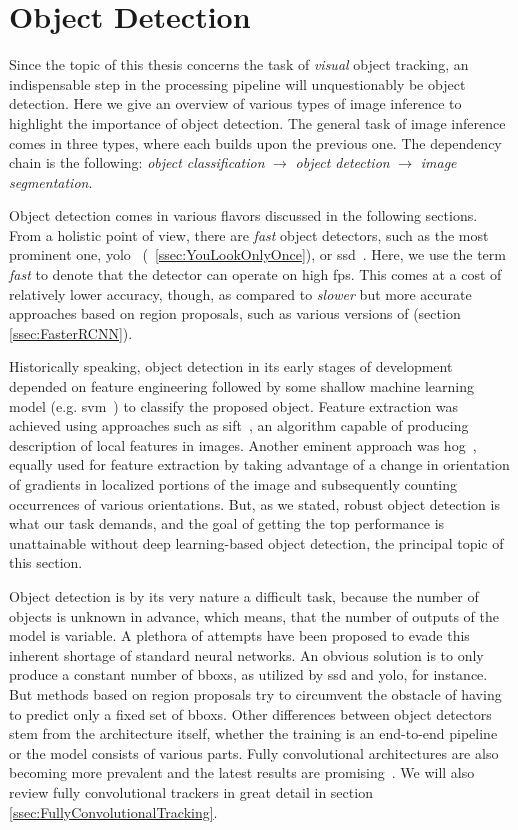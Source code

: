 \section{Object Detection}
\label{sec:ObjectDetection}

Since the topic of this thesis concerns the task of \emph{visual} object tracking, an indispensable step in the processing pipeline will unquestionably be object detection. Here we give an overview of various types of image inference to highlight the importance of object detection. The general task of image inference comes in three types, where each builds upon the previous one. The dependency chain is the following: \emph{object classification} $\to$ \emph{object detection} $\to$ \emph{image segmentation}.

Object detection comes in various flavors discussed in the following sections. From a holistic point of view, there are \emph{fast} object detectors, such as the most prominent one, \gls{yolo}~\cite{redmon2016yolo} (\sectionstr{}~\ref{ssec:YouLookOnlyOnce}), or \gls{ssd}~\cite{liu2016ssd}. Here, we use the term \emph{fast} to denote that the detector can operate on high \gls{fps}. This comes at a cost of relatively lower accuracy, though, as compared to \emph{slower} but more accurate approaches based on region proposals, such as various versions of \fasterrcnn{} (section \ref{ssec:FasterRCNN}).

Historically speaking, object detection in its early stages of development depended on feature engineering followed by some shallow machine learning model (e.g. \gls{svm}~\cite{cortes1995support}) to classify the proposed object. Feature extraction was achieved using approaches such as \gls{sift}~\cite{lowel1999objrecognition}, an algorithm capable of producing description of local features in images. Another eminent approach was \gls{hog}~\cite{mcconnell1986osti}, equally used for feature extraction by taking advantage of a change in orientation of gradients in localized portions of the image and subsequently counting occurrences of various orientations. But, as we stated, robust object detection is what our task demands, and the goal of getting the top performance is unattainable without deep learning-based object detection, the principal topic of this section.

Object detection is by its very nature a difficult task, because the number of objects is unknown in advance, which means, that the number of outputs of the model is variable. A plethora of attempts have been proposed to evade this inherent shortage of standard neural networks. An obvious solution is to only produce a constant number of \glspl{bbox}, as utilized by \gls{ssd} and \gls{yolo}, for instance. But methods based on region proposals try to circumvent the obstacle of having to predict only a fixed set of \glspl{bbox}. Other differences between object detectors stem from the architecture itself, whether the training is an end-to-end pipeline or the model consists of various parts. Fully convolutional architectures are also becoming more prevalent and the latest results are promising~\cite{tian2019fcos}. We will also review fully convolutional trackers in great detail in section \ref{ssec:FullyConvolutionalTracking}.


